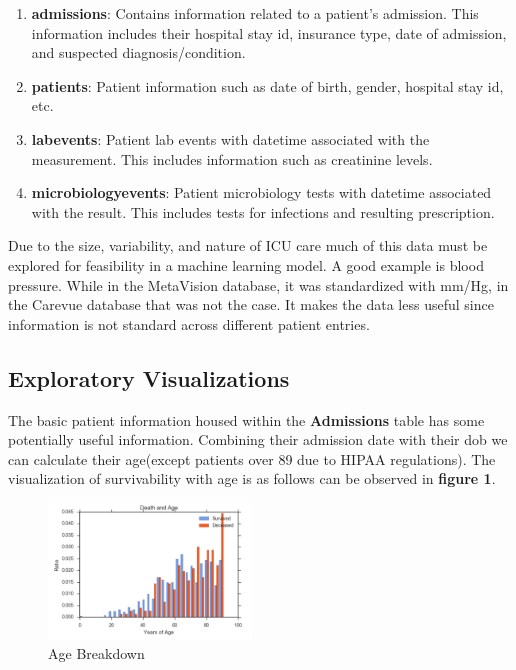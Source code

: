 \documentclass[11pt]{article}
\begin{document}
\begin{enumerate}
	\item \textbf{admissions}: Contains information related to a patient's admission. This information includes their hospital stay id, insurance type, date of admission, and suspected diagnosis/condition.
	\item \textbf{patients}: Patient information such as date of birth, gender, hospital stay id, etc. 
	\item \textbf{labevents}: Patient lab events with datetime associated with the measurement. This includes information such as creatinine levels.
	\item \textbf{microbiologyevents}: Patient microbiology tests with datetime associated with the result. This includes tests for infections and resulting prescription.
\end{enumerate}

Due to the size, variability, and nature of ICU care much of this data must be explored for feasibility in a machine learning model. A good example is blood pressure. While in the MetaVision database, it was standardized with mm/Hg, in the Carevue database that was not the case. It makes the data less useful since information is not standard across different patient entries.

\subsection{Exploratory Visualizations}
The basic patient information housed within the \textbf{Admissions} table has some potentially useful information. Combining their admission date with their dob we can calculate their age(except patients over 89 due to HIPAA regulations). The visualization of survivability with age is as follows can be observed in \textbf{figure 1}.

\begin{figure}
	\begin{center}
		\includegraphics[width=0.48\textwidth]{age.png}
	\end{center}
	\caption{Age Breakdown}
\end{figure}
\end{document}
